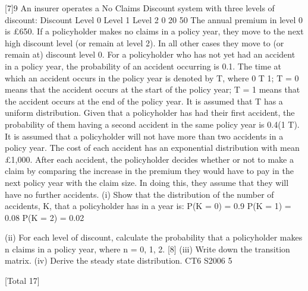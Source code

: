 \documentclass[a4paper,12pt]{article}
\begin{document}
 


[7]9
An insurer operates a No Claims Discount system with three levels of discount:
Discount
Level 0
Level 1
Level 2
0%
20%
50%
The annual premium in level 0 is £650.
If a policyholder makes no claims in a policy year, they move to the next high
discount level (or remain at level 2). In all other cases they move to (or remain at)
discount level 0.
For a policyholder who has not yet had an accident in a policy year, the probability of
an accident occurring is 0.1. The time at which an accident occurs in the policy year
is denoted by T, where
0 T 1;
T = 0 means that the accident occurs at the start of the policy year;
T = 1 means that the accident occurs at the end of the policy year.
It is assumed that T has a uniform distribution.
Given that a policyholder has had their first accident, the probability of them having a
second accident in the same policy year is 0.4(1 T). It is assumed that a
policyholder will not have more than two accidents in a policy year.
The cost of each accident has an exponential distribution with mean £1,000.
After each accident, the policyholder decides whether or not to make a claim by
comparing the increase in the premium they would have to pay in the next policy year
with the claim size. In doing this, they assume that they will have no further
accidents.
(i)
Show that the distribution of the number of accidents, K, that a policyholder
has in a year is:
P(K = 0) = 0.9
P(K = 1) = 0.08
P(K = 2) = 0.02

(ii) For each level of discount, calculate the probability that a policyholder makes
n claims in a policy year, where n = 0, 1, 2.
[8]
(iii) Write down the transition matrix.
(iv) Derive the steady state distribution.
CT6 S2006
5


[Total 17]
\end{document}
